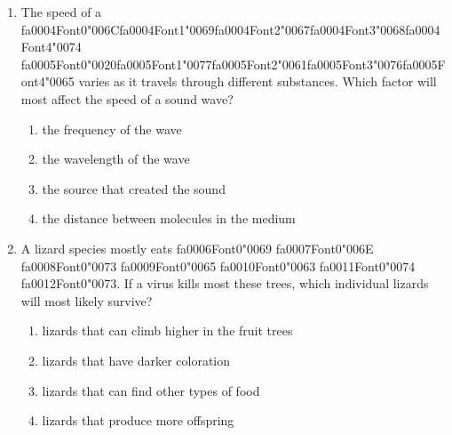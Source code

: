 \documentclass[12pt]{article}
\begin{document}
\begin{enumerate}[label=\arabic*.]
\begin{enumerate}[label=(\alph*)]
    \item A pure substance has a definite chemical composition.
    \item A pure substance cannot be broken down into simpler substances.
    \item A pure substance is normally found as a solid at room temperature.
\end{enumerate}
\item The speed of a {\csname fa0004Font0\endcsname\char"006C}{\csname fa0004Font1\endcsname\char"0069}{\csname fa0004Font2\endcsname\char"0067}{\csname fa0004Font3\endcsname\char"0068}{\csname fa0004Font4\endcsname\char"0074} {\csname fa0005Font0\endcsname\char"0020}{\csname fa0005Font1\endcsname\char"0077}{\csname fa0005Font2\endcsname\char"0061}{\csname fa0005Font3\endcsname\char"0076}{\csname fa0005Font4\endcsname\char"0065} varies as it travels through different substances. Which factor
will most affect the speed of a sound wave?
\begin{enumerate}[label=(\alph*)]
    \item the frequency of the wave
    \item the wavelength of the wave
    \item the source that created the sound
    \item the distance between molecules in the medium
\end{enumerate}
\item A lizard species mostly eats {\csname fa0006Font0\endcsname\char"0069} {\csname fa0007Font0\endcsname\char"006E} {\csname fa0008Font0\endcsname\char"0073} {\csname fa0009Font0\endcsname\char"0065} {\csname fa0010Font0\endcsname\char"0063} {\csname fa0011Font0\endcsname\char"0074} {\csname fa0012Font0\endcsname\char"0073}. If a virus kills most
these trees, which individual lizards will most likely survive?
\begin{enumerate}[label=(\alph*)]
    \item lizards that can climb higher in the fruit trees
    \item lizards that have darker coloration
    \item lizards that can find other types of food
    \item lizards that produce more offspring
\end{enumerate}
\end{enumerate}
\end{document}
